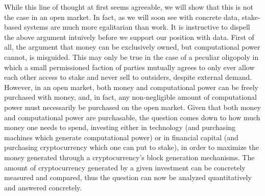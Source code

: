 While this line of thought at first seems agreeable, we will show that this
is not the case in an open market. In fact, as we will soon see with concrete
data, stake-based systems are much more egalitarian than work. It is instructive
to dispell the above argument intuively before we support our position with
data. First of all, the argument that money can be exclusively owned, but
computational power cannot, is misguided. This may only be true in the case of
a peculiar oligopoly in which a small permissioned faction of parties mutually
agrees to only ever allow each other access to stake and never sell to
outsiders, despite external demand. However, in an open market, both money and
computational power can be freely purchased with money, and, in fact, any
non-negligible amount of computational power must necessarily be purchased on
the open market. Given that both money and computational power are purchasable,
the question comes down to how much money one needs to spend, investing either
in technology (and purchasing machines which generate computational power) or in
financial capital (and purchasing cryptocurrency which one can put to stake), in
order to maximize the money generated through a cryptocurrency's block
generation mechanisms. The amount of cryptocurrency generated by a given
investment can be concretely measured and compared, thus the question can now be
analyzed quantitatively and answered concretely.
